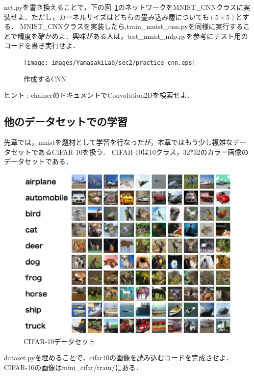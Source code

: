 \begin{practice}
net.pyを書き換えることで，下の図~\ref{fig:prac_cnn}のネットワークをMNIST\_CNNクラスに実装せよ．ただし，カーネルサイズはどちらの畳み込み層についても\(\left(5 \times 5 \right)\)とする．
MNIST\_CNNクラスを実装したら,train\_mnist\_cnn.pyを同様に実行することで精度を確かめよ．興味がある人は，test\_mnist\_mlp.pyを参考にテスト用のコードを書き実行せよ．
\begin{figure}[ht]
	\begin{center}
		\texttt{[image: images/YamasakiLab/sec2/practice\_cnn.eps]}
		\caption{作成するCNN}
		\label{fig:prac_cnn}
	\end{center}
\end{figure}

ヒント : chainerのドキュメントでConvolution2Dを検索せよ．
\end{practice}

\subsection{他のデータセットでの学習}
先章では，mnistを題材として学習を行なったが，本章ではもう少し複雑なデータセットであるCIFAR-10を扱う．
CIFAR-10は10クラス，32*32のカラー画像のデータセットである．
\begin{figure}[h]
	\begin{center}
		\includegraphics[width=0.8\linewidth] {images/YamasakiLab/sec2/cifar10.eps}
		\caption{CIFAR-10データセット}
		\label{fig:cifar-10}
	\end{center}
\end{figure}
\begin{practice}
dataset.pyを埋めることで，cifar10の画像を読み込むコードを完成させよ．CIFAR-10の画像はmini\_cifar/train/にある．
\end{practice}


